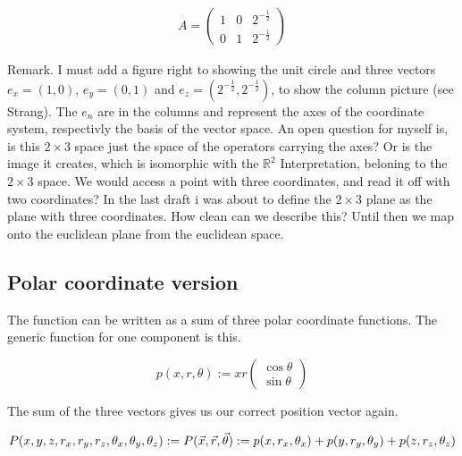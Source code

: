 \documentclass[a4paper]{article}
\begin{document}
\begin{displaymath}
\begin{align}
	A = \begin{pmatrix}
	1&0&2^{-\frac12}\\
	0&1&2^{-\frac12}
	\end{pmatrix}
\end{align}
\end{displaymath}

Remark. I must add a figure right to showing the unit circle and three vectors $e_x = (1,0)$, $e_y = (0,1)$ and $e_z = (2^{-\frac12}, 2^{-\frac12})$, to show the column picture (see Strang). The $e_n$ are in the columns and represent the axes of the coordinate system, respectivly the basis of the vector space. An open question for myself is, is this $2 \times 3$ space just the space of the operators carrying the axes? Or is the image it creates, which is isomorphic with the $\mathbb{R}^{2}$ Interpretation, beloning to the $2\times 3$ space. We would access a point with three coordinates, and read it off with two coordinates? In the last draft i was about to define the $2 \times 3$ plane as the plane with three coordinates. How clean can we describe this? Until then we map onto the euclidean plane from the euclidean space.





\subsection{Polar coordinate version}
\label{polar_coord_func}

The function can be written as a sum of three polar coordinate functions. The generic function for one component is this.

\begin{displaymath}
p(x, r, \theta) := xr\begin{pmatrix}\cos\theta\\\sin\theta\end{pmatrix}
\end{displaymath}

The sum of the three vectors gives us our correct position vector again.

\begin{displaymath}
P(x,y,z,r_x,r_y,r_z,\theta_x,\theta_y,\theta_z) :=  P(\vec{x}, \vec{r}, \vec{\theta}) := p(x, r_x, \theta_x)+p(y, r_y, \theta_y)+p(z, r_z, \theta_z)\\
\end{displaymath}
\end{document}
